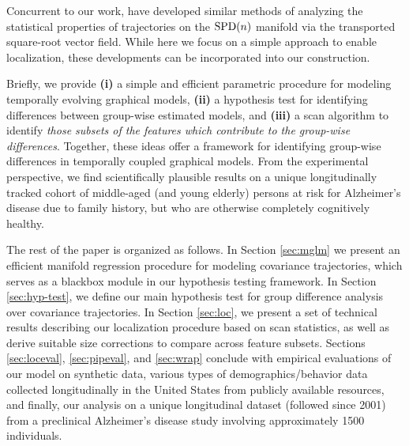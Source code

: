 
Concurrent to our work, \cite{su2014statistical,zhang2018rate} have developed similar methods of analyzing the statistical properties of trajectories on the $\text{SPD}(n)$ manifold via the transported square-root vector field. While here we focus on a simple approach to enable localization, these developments can be incorporated into our construction.

Briefly, we provide \textbf{(i)} a simple and efficient parametric procedure for modeling temporally evolving graphical models, \textbf{(ii)} a 
hypothesis test for identifying differences between group-wise estimated models, and \textbf{(iii)} a scan
algorithm to identify {\em those subsets of the features which contribute to the group-wise differences}.
Together, these ideas offer a framework for identifying group-wise differences in temporally coupled graphical models.
From the experimental perspective, we find scientifically plausible results on 
a unique longitudinally tracked cohort of middle-aged (and young elderly) persons at risk for Alzheimer's disease due to family history, 
but who are otherwise completely cognitively healthy.

The rest of the paper is organized as follows. In Section \ref{sec:mglm} we present an efficient manifold regression procedure for 
modeling covariance trajectories, which serves as a blackbox module in our hypothesis testing framework. 
In Section \ref{sec:hyp-test}, we define our main hypothesis test for group difference analysis over covariance trajectories. 
In Section \ref{sec:loc}, we present a set of technical results describing our localization procedure based on scan statistics, 
as well as derive suitable size corrections to compare across feature subsets. Sections \ref{sec:loceval}, \ref{sec:pipeval}, and \ref{sec:wrap} conclude with
empirical evaluations of our model on synthetic data, various types of demographics/behavior data collected longitudinally 
in the United States from publicly available resources, and finally, our 
analysis on a unique longitudinal dataset (followed since 2001) from a preclinical Alzheimer's disease study involving approximately 1500 individuals.
